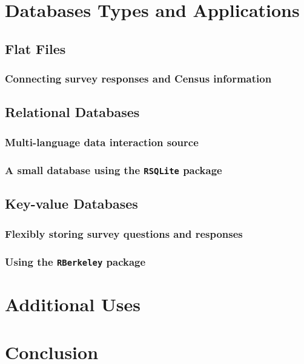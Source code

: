 \documentclass[]{article}
\begin{document}
\section{Databases Types and Applications}

\subsection{Flat Files}

\subsubsection{Connecting survey responses and Census information}

\subsection{Relational Databases}

\subsubsection{Multi-language data interaction source}

\citep{Fredrickson:2010fk}

\subsubsection{A small database using the \texttt{RSQLite} package}

\subsection{Key-value Databases}

\subsubsection{Flexibly storing survey questions and responses}

\subsubsection{Using the \texttt{RBerkeley} package}

\section{Additional Uses}


\section{Conclusion}



\end{document}

